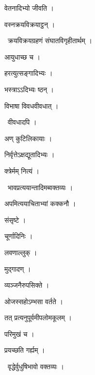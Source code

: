 \documentclass[10pt, openany, oneside]{book}
\begin{document}
\noindent वेतनादिभ्यो जीवति ।

\noindent वस्नक्रयविक्रयाट्ठन् ।

\par\noindent\hspace{1.5em}{\vps वा॰}~{\qt क्रयविक्रयग्रहणं संघातविगृहीतार्थम् ।}

\noindent आयुधाच्छ च ।

\noindent हरत्युत्सङ्गादिभ्यः ।

\noindent भस्त्राऽऽदिभ्यः ष्ठन् ।

\noindent विभाषा विवधवीवधात् ।

\par\noindent\hspace{1.5em}{\vps वा॰}~{\qt वीवधादपि ।}

\noindent अण् कुटिलिकायाः ।

\noindent निर्वृत्तेऽक्षद्यूतादिभ्यः ।

\noindent क्त्रेर्मम् नित्यं ।

\par\noindent\hspace{1.5em}{\vps वा॰}~{\qt भावप्रत्ययान्तादिमब्वक्तव्यः ।}

\noindent अपमित्ययाचिताभ्यां कक्कनौ ।

\noindent संसृष्टे ।

\noindent चूर्णादिनिः ।

\noindent लवणाल्लुक् ।

\noindent मुद्गादण् ।

\noindent व्यञ्जनैरुपसिक्ते ।

\noindent ओजस्सहोऽम्भसा वर्तते ।

\noindent तत् प्रत्यनुपूर्वमीपलोमकूलम् ।

\noindent परिमुखं च ।

\noindent प्रयच्छति गर्ह्यम् ।

\par\noindent\hspace{1.5em}{\vps वा॰}~{\qt वृद्धेर्वुधुषिभावो वक्तव्यः ।}
\end{document}
